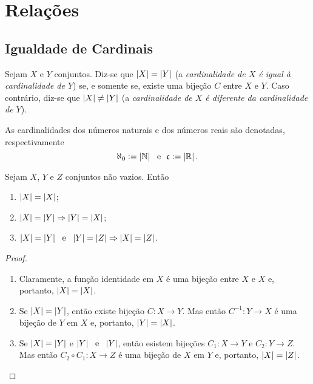 \section{Relações}

\subsection{Igualdade de Cardinais}

\begin{defi}
	Sejam $X$ e $Y$ conjuntos. Diz-se que $\left\vert{X}\right\vert = \left\vert{Y}\right\vert$ (a \emph{cardinalidade de $X$ é igual à cardinalidade de $Y$}) se, e somente se, existe uma bijeção $C$ entre $X$ e $Y$. Caso contrário, diz-se que $\left\vert{X}\right\vert \neq \left\vert{Y}\right\vert$ (a \emph{cardinalidade de $X$ é diferente da cardinalidade de $Y$}).

	As cardinalidades dos números naturais e dos números reais são denotadas, respectivamente
	\begin{equation*}
	\aleph_0 := \left\vert{\mathbb{N}}\right\vert \text{\ \ e\ \ } \mathfrak c := \left\vert{\mathbb{R}}\right\vert.
	\end{equation*}
\end{defi}

\begin{prop}\label{conj:prop.card.rel.equiv}
	Sejam $X$, $Y$ e $Z$ conjuntos não vazios. Então
	\begin{enumerate}
	\item $\left\vert{X}\right\vert = \left\vert{X}\right\vert$;
	\item $\left\vert{X}\right\vert = \left\vert{Y}\right\vert \Rightarrow \left\vert{Y}\right\vert = \left\vert{X}\right\vert$;
	\item $\left\vert{X}\right\vert = \left\vert{Y}\right\vert \text{\ \ e\ \ } \left\vert{Y}\right\vert = \left\vert{Z}\right\vert \Rightarrow \left\vert{X}\right\vert = \left\vert{Z}\right\vert$.
	\end{enumerate}
\end{prop}
\begin{proof}
	\begin{enumerate}
	\item Claramente, a função identidade em $X$ é uma bijeção entre $X$ e $X$ e, portanto, $\left\vert{X}\right\vert = \left\vert{X}\right\vert$.
	\item Se $\left\vert{X}\right\vert = \left\vert{Y}\right\vert$, então existe bijeção $C: X \to Y$. Mas então $C^{-1}:Y \to X$ é uma bijeção de $Y$ em $X$ e, portanto, $\left\vert{Y}\right\vert = \left\vert{X}\right\vert$.
	\item Se $\left\vert{X}\right\vert = \left\vert{Y}\right\vert$ e $\left\vert{Y}\right\vert \text{\ \ e\ \ } \left\vert{Y}\right\vert$, então esistem bijeções $C_1: X \to Y$ e $C_2: Y \to Z$. Mas então $C_2 \circ C_1 : X \to Z$ é uma bijeção de $X$ em $Y$ e, portanto, $\left\vert{X}\right\vert = \left\vert{Z}\right\vert$.
	\end{enumerate}
\end{proof}

